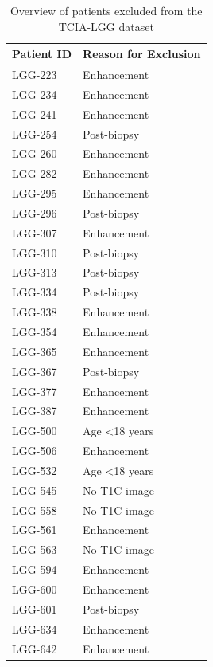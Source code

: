 \begin{subappendices}
\begin{table}[h]
    \centering
    \begin{tabular}{ll}
        \toprule
        \textbf{Patient ID} & \textbf{Reason for Exclusion} \\
        \midrule
        LGG-223 & Enhancement \\
        LGG-234 & Enhancement \\
        LGG-241 & Enhancement \\
        LGG-254 & Post-biopsy \\
        LGG-260 & Enhancement \\
        LGG-282 & Enhancement \\
        LGG-295 & Enhancement \\
        LGG-296 & Post-biopsy \\
        LGG-307 & Enhancement \\
        LGG-310 & Post-biopsy \\
        LGG-313 & Post-biopsy \\
        LGG-334 & Post-biopsy \\
        LGG-338 & Enhancement \\
        LGG-354 & Enhancement \\
        LGG-365 & Enhancement \\
        LGG-367 & Post-biopsy \\
        LGG-377 & Enhancement \\
        LGG-387 & Enhancement \\
        LGG-500 & Age \textless 18 years \\
        LGG-506 & Enhancement \\
        LGG-532 & Age \textless 18 years \\
        LGG-545 & No \gls{T1C} image \\
        LGG-558 & No \gls{T1C} image \\
        LGG-561 & Enhancement \\
        LGG-563 & No \gls{T1C} image \\
        LGG-594 & Enhancement \\
        LGG-600 & Enhancement \\
        LGG-601 & Post-biopsy \\
        LGG-634 & Enhancement \\
        LGG-642 & Enhancement\\
        \bottomrule
    \end{tabular}
    \caption{Overview of patients excluded from the TCIA-LGG dataset}
\end{table}


\end{subappendices}

